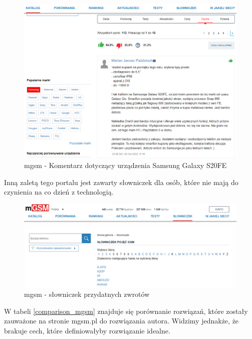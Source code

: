 \begin{figure}[H]
    \centering
    \includegraphics[scale=0.45]{img/mgsm/mgsmComments.png}
    \caption{mgsm - Komentarz dotyczący urządzenia Samsung Galaxy S20FE}
    \label{mgsm_4}
\end{figure}
Inną zaletą tego portalu jest zawarty słowniczek dla osób, które nie mają do czynienia na co dzień z technologią. 
\begin{figure}[H]
    \centering
    \includegraphics[scale=0.47]{img/mgsm/dictonary.png}
    \caption{mgsm - słowniczek przydatnych zwrotów }
    \label{mgsm_5}
\end{figure}
W tabeli \ref*{comparison_mgsm} znajduje się porównanie rozwiązań, które zostały zauważone na stronie mgsm.pl do rozwiązania autora. Widzimy jednakże, że brakuje cech, które definiowałyby rozwiązanie idealne.
